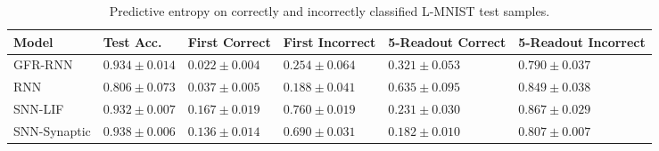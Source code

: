 \begin{table}
    \caption{Predictive entropy on correctly and incorrectly classified L-MNIST test samples.}
    \label{tab:lmnist-entropy}
    \centering
    \begin{tabular}{llllll}
    \toprule
    \textbf{Model} & \textbf{Test Acc.} & \textbf{First Correct} & \textbf{First Incorrect} & \textbf{5-Readout Correct} & \textbf{5-Readout Incorrect} \\
    \midrule
    GFR-RNN & $0.934 \pm 0.014$ & $0.022 \pm 0.004$ & $0.254 \pm 0.064$ & $0.321 \pm 0.053$ & $0.790 \pm 0.037$ \\
    RNN & $0.806 \pm 0.073$ & $0.037 \pm 0.005$ & $0.188 \pm 0.041$ & $0.635 \pm 0.095$ & $0.849 \pm 0.038$ \\
    SNN-LIF & $0.932 \pm 0.007$ & $0.167 \pm 0.019$ & $0.760 \pm 0.019$ & $0.231 \pm 0.030$ & $0.867 \pm 0.029$ \\
    SNN-Synaptic & $0.938 \pm 0.006$ & $0.136 \pm 0.014$ & $0.690 \pm 0.031$ & $0.182 \pm 0.010$ & $0.807 \pm 0.007$ \\
    \bottomrule
    \end{tabular}
\end{table}
